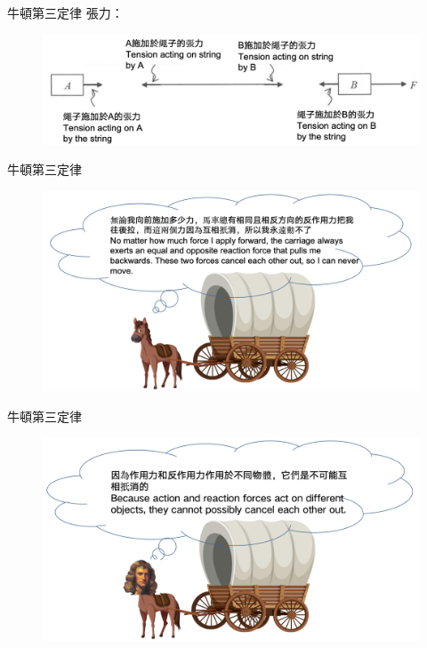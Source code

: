 \documentclass[beamer=true]{standalone}
\begin{document}
\begin{frame}{牛頓第三定律 }
    張力：
    \begin{figure}[h!]
        \centering
        \includegraphics[width=.8\textwidth]{assets/f559bb67.png}
    \end{figure}
\end{frame}


\begin{frame}{牛頓第三定律 }
    \begin{figure}[h!]
        \centering
        \includegraphics[width=\textwidth]{assets/4b5ef98a.png}
    \end{figure}
\end{frame}
\begin{frame}{牛頓第三定律 }
    \begin{figure}[h!]
        \centering
        \includegraphics[width=\textwidth]{assets/9334d132.png}
    \end{figure}
\end{frame}
\end{document}
